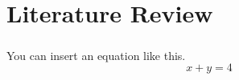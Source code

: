 \chapter{Literature Review}
\label{chap:literature_review}
\paragraph{} You can insert an equation like this.
\begin{equation}  
x + y = 4   
\end{equation}